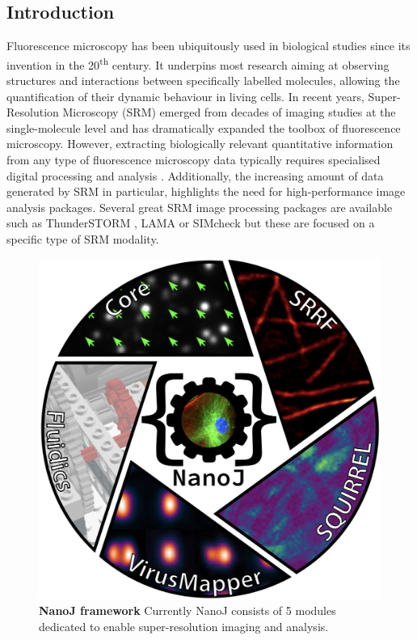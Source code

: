 \subsection*{Introduction}
 Fluorescence microscopy has been ubiquitously used in biological studies since its invention in the 20\textsuperscript{th} century. It underpins most research aiming at observing structures and interactions between specifically labelled molecules, allowing the quantification of their dynamic behaviour in living cells. In recent years, Super-Resolution Microscopy (SRM) emerged from decades of imaging studies at the single-molecule level and has dramatically expanded the toolbox of fluorescence microscopy. However, extracting biologically relevant quantitative information from any type of fluorescence microscopy data typically requires specialised digital processing and analysis \cite{wheeler2017standard}. Additionally, the increasing amount of data generated by SRM in particular, highlights the need for high-performance image analysis packages.  Several great SRM image processing packages are available such as ThunderSTORM \cite{ovesny2014thunderstorm}, LAMA \cite{Malkusch2016LAMA} or SIMcheck \cite{schermelleh2015simcheck} but these are focused on a specific type of SRM modality.
  
 \begin{figure}[!t]
    \centering
    \includegraphics[width=\linewidth]{Figures/Figure1_v3.png}
    \caption{\textbf{NanoJ framework} Currently NanoJ consists of 5 modules dedicated to enable super-resolution imaging and analysis.}
    \label{fig:GeneralDiagram}
 \end{figure}
  
